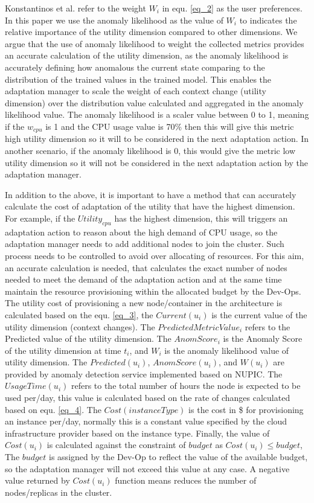 \documentclass[sigconf]{acmart}
\begin{document}
Konstantinos et al. \cite{KonstantinosKakousis:2008ub} refer to the weight $W_{i}$ in equ. \ref{eq_2} as the user preferences. In this paper we use the anomaly likelihood as the value of $W_{i}$ to indicates the relative importance of the utility dimension compared to other dimensions. We argue that the use of anomaly likelihood to weight the collected metrics provides an accurate calculation of the utility dimension, as the anomaly likelihood is accurately defining how anomalous the current state comparing to the distribution of the trained values in the trained model. This enables the adaptation manager to scale the weight of each context change (utility dimension) over the distribution value calculated and aggregated in the anomaly likelihood value. The anomaly likelihood is a scaler value between 0 to 1, meaning if the $w_{cpu}$ is 1 and the CPU usage value is 70\% then this will give this metric high utility dimension so it will to be considered in the next adaptation action. In another scenario, if the anomaly likelihood is 0, this would give the metric low utility dimension so it will not be considered in the next adaptation action by the adaptation manager. 


In addition to the above, it is important to have a method that can accurately calculate the cost of adaptation of the utility that have the highest dimension. For example, if the $Utility_{cpu}$ has the highest dimension, this will triggers an adaptation action to reason about the high demand of CPU usage, so the adaptation manager needs to add additional nodes to join the cluster. Such process needs to be controlled to avoid over allocating of resources. For this aim, an accurate calculation is needed, that calculates the exact number of nodes needed to meet the demand of the adaptation action and at the same time maintain the resource provisioning within the allocated budget by the Dev-Ops. The utility cost of provisioning a new node/container in the architecture is calculated based on the equ. \ref{eq_3}, the $Current(u_{i})$ is the current value of the utility dimension (context changes). The $PredictedMetricValue_{i}$ refers to the Predicted value of the utility dimension. The $AnomScore_{i}$ is the Anomaly Score of the utility dimension at time $t_{i}$, and $W_{i}$ is the anomaly likelihood value of utility dimension. The $Predicted(u_{i})$, $AnomScore(u_{i})$, and $W(u_{i})$ are provided by anomaly detection service implemented based on NUPIC.  The $UsageTime(u_{i})$ refers to the total number of hours the node is expected to be used per/day, this value is calculated based on the rate of changes calculated based on equ. \ref{eq_4}. The $Cost(instanceType)$ is the cost in \$ for provisioning an instance per/day, normally this is a constant value specified by the cloud infrastructure provider based on the instance type. Finally, the value of $Cost(u_{i})$ is calculated against the constraint of $budget$ as $ Cost(u_{i})  \leq  budget $, The $budget$ is assigned by the Dev-Op to reflect the value of the available budget, so the adaptation manager will not exceed this value at any case. A negative value returned by   $Cost(u_{i})$ function means reduces the number of nodes/replicas in the cluster. 
\end{document}
